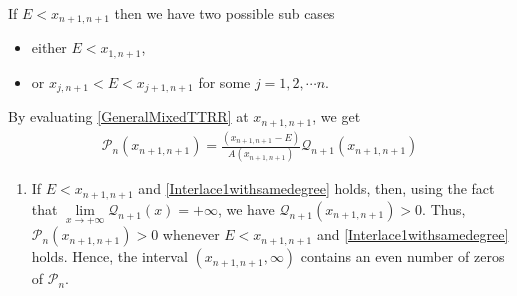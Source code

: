 \documentclass[final,3p,times,12pt]{elsarticle}
\numberwithin{equation}{section}  %
\begin{document}
If $E<x_{n+1,n+1}$ then we have two possible sub cases
\begin{itemize}
	\item either $E<x_{1,n+1}$,
	\item or $x_{j,n+1}<E< x_{j+1,n+1}$ for some $j=1,2,\cdots n$.
\end{itemize}
By evaluating \eqref{GeneralMixedTTRR} at $x_{n+1,n+1}$, we get
\begin{align}\label{GeneralMixedTTRR-at-x_n+1}
	\mathcal{P}_n(x_{n+1,n+1})=\frac{(x_{n+1,n+1}-E)}{A(x_{n+1,n+1})}\mathcal{Q}_{n+1}(x_{n+1,n+1})
\end{align}
\begin{enumerate}
	\item  If $E < x_{n+1,n+1}$ and \eqref{Interlace1withsamedegree} holds, then, using the fact that $\lim\limits_{x\rightarrow +\infty}\mathcal{Q}_{n+1}(x)=+\infty$, we have $\mathcal{Q}_{n+1}(x_{n+1,n+1})>0$. Thus, $\mathcal{P}_n(x_{n+1,n+1})>0$ whenever $E < x_{n+1,n+1}$  and \eqref{Interlace1withsamedegree} holds. Hence, the interval $(x_{n+1,n+1}, \infty)$ contains an even number of zeros of $\mathcal{P}_n$.
	

\end{enumerate}
\end{document}
